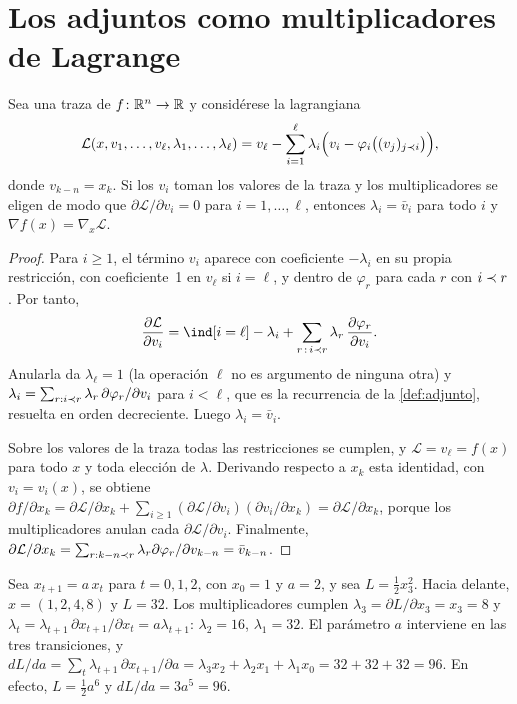 \section{Los adjuntos como multiplicadores de Lagrange}

\begin{teorema}\label{teo:lagrange}
Sea una traza de $f\colon\mathbb{R}^{n}\to\mathbb{R}$ y considérese la lagrangiana
\[
\mathcal L(x,v_1,\dots,v_\ell,\lambda_1,\dots,\lambda_\ell)=v_\ell-\sum_{i=1}^{\ell}\lambda_i\Bigl(v_i-\varphi_i\bigl((v_j)_{j\prec i}\bigr)\Bigr),
\]
donde $v_{k-n}=x_k$. Si los $v_i$ toman los valores de la traza y los multiplicadores se eligen de modo que $\partial\mathcal L/\partial v_i=0$ para $i=1,\dots,\ell$, entonces $\lambda_i=\bar v_i$ para todo $i$ y $\nabla f(x)=\nabla_x\mathcal L$.
\end{teorema}

\begin{proof}
Para $i\ge 1$, el término $v_i$ aparece con coeficiente $-\lambda_i$ en su propia restricción, con coeficiente~1 en $v_\ell$ si $i=\ell$, y dentro de $\varphi_r$ para cada $r$ con $i\prec r$. Por tanto,
\[
\frac{\partial\mathcal L}{\partial v_i}=\ind[i=\ell]-\lambda_i+\sum_{r\,:\,i\pre r}\lambda_r\,\frac{\partial\varphi_r}{\partial v_i}.
\]
Anularla da $\lambda_\ell=1$ (la operación $\ell$ no es argumento de ninguna otra) y $\lambda_i=\sum_{r:i\prec r}\lambda_r\,\partial\varphi_r/\partial v_i$ para $i<\ell$, que es la recurrencia de la \cref{def:adjunto}, resuelta en orden decreciente. Luego $\lambda_i=\bar v_i$.

Sobre los valores de la traza todas las restricciones se cumplen, y $\mathcal L=v_\ell=f(x)$ para todo $x$ y toda elección de $\lambda$. Derivando respecto a $x_k$ esta identidad, con $v_i=v_i(x)$, se obtiene $\partial f/\partial x_k=\partial\mathcal L/\partial x_k+\sum_{i\ge 1}(\partial\mathcal L/\partial v_i)(\partial v_i/\partial x_k)=\partial\mathcal L/\partial x_k$, porque los multiplicadores anulan cada $\partial\mathcal L/\partial v_i$. Finalmente, $\partial\mathcal L/\partial x_k=\sum_{r:k-n\prec r}\lambda_r\partial\varphi_r/\partial v_{k-n}=\bar v_{k-n}$.
\end{proof}

\begin{ejemplo}\label{ej:recurrencia}
Sea $x_{t+1}=a\,x_t$ para $t=0,1,2$, con $x_0=1$ y $a=2$, y sea $L=\tfrac12x_3^{2}$. Hacia delante, $x=(1,2,4,8)$ y $L=32$. Los multiplicadores cumplen $\lambda_3=\partial L/\partial x_3=x_3=8$ y $\lambda_t=\lambda_{t+1}\,\partial x_{t+1}/\partial x_t=a\lambda_{t+1}$: $\lambda_2=16$, $\lambda_1=32$. El parámetro $a$ interviene en las tres transiciones, y $dL/da=\sum_t\lambda_{t+1}\,\partial x_{t+1}/\partial a=\lambda_3x_2+\lambda_2x_1+\lambda_1x_0=32+32+32=96$. En efecto, $L=\tfrac12a^{6}$ y $dL/da=3a^{5}=96$.
\end{ejemplo}


